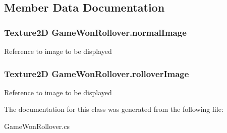 \subsection{Member Data Documentation}
\hypertarget{class_game_won_rollover_a34f70647ed3d11b473719789f3a70d17}{
\subsubsection[{normal\-Image}]{\setlength{\rightskip}{0pt plus 5cm}Texture2\-D Game\-Won\-Rollover.\-normal\-Image}}\label{class_game_won_rollover_a34f70647ed3d11b473719789f3a70d17}
Reference to image to be displayed \hypertarget{class_game_won_rollover_a8fdd8cbd840e471566a0731f80e96a57}{
\subsubsection[{rollover\-Image}]{\setlength{\rightskip}{0pt plus 5cm}Texture2\-D Game\-Won\-Rollover.\-rollover\-Image}}\label{class_game_won_rollover_a8fdd8cbd840e471566a0731f80e96a57}
Reference to image to be displayed 

The documentation for this class was generated from the following file\-:\begin{DoxyCompactItemize}
\item 
Game\-Won\-Rollover.\-cs\end{DoxyCompactItemize}

